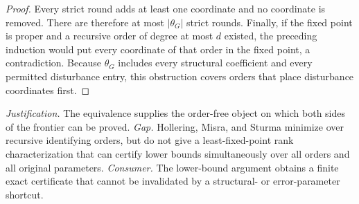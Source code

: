 \documentclass{article}
\begin{document}
\begin{proof}
Every strict round adds at least one coordinate and no coordinate is removed.  There are therefore at most \(|\theta_G|\) strict rounds.  Finally, if the fixed point is proper and a recursive order of degree at most \(d\) existed, the preceding induction would put every coordinate of that order in the fixed point, a contradiction.  Because \(\theta_G\) includes every structural coefficient and every permitted disturbance entry, this obstruction covers orders that place disturbance coordinates first.
\end{proof}
\par\smallskip\noindent \textit{Justification.} The equivalence supplies the order-free object on which both sides of the frontier can be proved. \textit{Gap.} Hollering, Misra, and Sturma minimize over recursive identifying orders, but do not give a least-fixed-point rank characterization that can certify lower bounds simultaneously over all orders and all original parameters. \textit{Consumer.} The lower-bound argument obtains a finite exact certificate that cannot be invalidated by a structural- or error-parameter shortcut.
\end{document}
